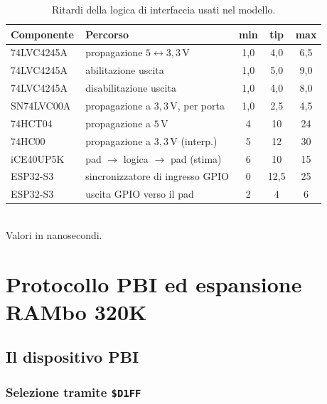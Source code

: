 \documentclass[11pt,a4paper,twoside,openright]{report}
\newcommand{\hex}[1]{\texttt{\$#1}}
\begin{document}
\begin{table}[htbp]
  \centering
  \caption{Ritardi della logica di interfaccia usati nel modello.}
  \label{tab:glue}
  \begin{tabular}{llccc}
    \toprule
    \textbf{Componente} & \textbf{Percorso} & \textbf{min} & \textbf{tip} & \textbf{max} \\
    \midrule
    74LVC4245A~\cite{lvc4245} & propagazione $5\leftrightarrow3{,}3\,\mathrm{V}$ & 1{,}0 & 4{,}0 & 6{,}5 \\
    74LVC4245A               & abilitazione uscita                             & 1{,}0 & 5{,}0 & 9{,}0 \\
    74LVC4245A               & disabilitazione uscita                          & 1{,}0 & 4{,}0 & 8{,}0 \\
    SN74LVC00A~\cite{lvc00}  & propagazione a $3{,}3\,\mathrm{V}$, per porta    & 1{,}0 & 2{,}5 & 4{,}5 \\
    74HCT04~\cite{hct04}     & propagazione a $5\,\mathrm{V}$                  & 4     & 10    & 24 \\
    74HC00~\cite{hc00}       & propagazione a $3{,}3\,\mathrm{V}$ (interp.)    & 5     & 12    & 30 \\
    iCE40UP5K~\cite{ice40}   & pad $\to$ logica $\to$ pad (stima)              & 6     & 10    & 15 \\
    ESP32-S3                 & sincronizzatore di ingresso GPIO                & 0     & 12{,}5 & 25 \\
    ESP32-S3                 & uscita GPIO verso il pad                        & 2     & 4     & 6 \\
    \bottomrule
  \end{tabular}\\[2pt]
  {\footnotesize Valori in nanosecondi.}
\end{table}

\chapter{Protocollo PBI ed espansione RAMbo 320K}
\label{cap:pbi}

\section{Il dispositivo PBI}

\subsection{Selezione tramite \hex{D1FF}}
\end{document}
